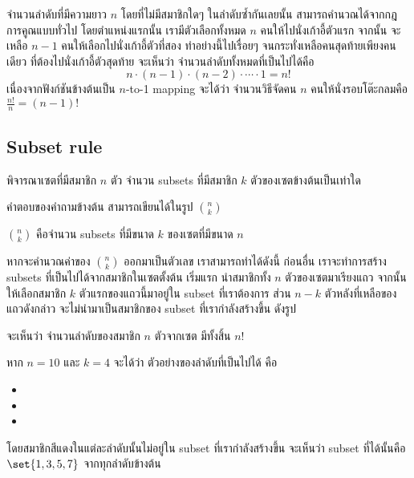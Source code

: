 \begin{example}
จำนวนลำดับที่มีความยาว $n$ โดยที่ไม่มีสมาชิกใดๆ ในลำดับซ้ำกันเลยนั้น สามารถคำนวณได้จากกฎการคูณแบบทั่วไป โดยตำแหน่งแรกนั้น เรามีตัวเลือกทั้งหมด $n$ คนให้ไปนั่งเก้าอี้ตัวแรก \enskip จากนั้น จะเหลือ $n-1$ คนให้เลือกไปนั่งเก้าอี้ตัวที่สอง \enskip ทำอย่างนี้ไปเรื่อยๆ \enskip จนกระทั่งเหลือคนสุดท้ายเพียงคนเดียว ที่ต้องไปนั่งเก้าอี้ตัวสุดท้าย \enskip จะเห็นว่า จำนวนลำดับทั้งหมดที่เป็นไปได้คือ
\[n\cdot(n-1)\cdot(n-2)\cdot\cdots\cdot 1=n!\]
เนื่องจากฟังก์ชันข้างต้นเป็น $n$-to-1 mapping จะได้ว่า จำนวนวิธีจัดคน $n$ คนให้นั่งรอบโต๊ะกลมคือ $\frac{n!}{n}=(n-1)!$
\end{example}

\subsection{Subset rule}
พิจารณาเซตที่มีสมาชิก $n$ ตัว \enskip จำนวน subsets ที่มีสมาชิก $k$ ตัวของเซตข้างต้นเป็นเท่าใด

คำตอบของคำถามข้างต้น สามารถเขียนได้ในรูป $\binom{n}{k}$

\begin{definition}
$\binom{n}{k}$ คือจำนวน subsets ที่มีขนาด $k$ ของเซตที่มีขนาด $n$
\end{definition}

หากจะคำนวณค่าของ $\binom{n}{k}$ ออกมาเป็นตัวเลข เราสามารถทำได้ดังนี้ \enskip ก่อนอื่น เราจะทำการสร้าง subsets ที่เป็นไปได้จากสมาชิกในเซตตั้งต้น \enskip เริ่มแรก นำสมาชิกทั้ง $n$ ตัวของเซตมาเรียงแถว จากนั้น ให้เลือกสมาชิก $k$ ตัวแรกของแถวนี้มาอยู่ใน subset ที่เราต้องการ ส่วน $n-k$ ตัวหลังที่เหลือของแถวดังกล่าว จะไม่นำมาเป็นสมาชิกของ subset ที่เรากำลังสร้างขึ้น ดังรูป
\begin{center}
\end{center}
จะเห็นว่า จำนวนลำดับของสมาชิก $n$ ตัวจากเซต มีทั้งสิ้น $n!$
%
\begin{example}
หาก $n=10$ และ $k=4$ จะได้ว่า ตัวอย่างของลำดับที่เป็นไปได้ คือ
\begin{itemize}[]
\item {}
\item {}
\item {}
\end{itemize}
โดยสมาชิกสีแดงในแต่ละลำดับนั้นไม่อยู่ใน subset ที่เรากำลังสร้างขึ้น จะเห็นว่า subset ที่ได้นั้นคือ $\set{1,3,5,7}$ จากทุกลำดับข้างต้น
\end{example}

